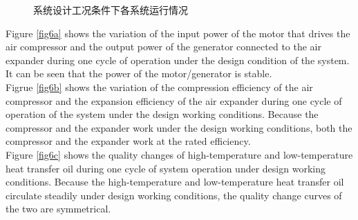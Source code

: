 \documentclass[journal,onecolumn]{IEEEtran}
\begin{document}
\begin{figure}[ht]
{\begin{minipage}{0.5\linewidth}
			\label{fig6c}   %
		\end{minipage}
	}
	\caption{系统设计工况条件下各系统运行情况} %
	\label{fig:6}  %
\end{figure}

Figure \ref{fig6a} shows the variation of the input power of the motor that drives the air compressor and the output power of the generator connected to the air expander during one cycle of operation under the design condition of the system. It can be seen that the power of the motor/generator is stable.\\

Figrue \ref{fig6b} shows the variation of the compression efficiency of the air compressor and the expansion efficiency of the air expander during one cycle of operation of the system under the design working conditions. Because the compressor and the expander work under the design working conditions, both the compressor and the expander work at the rated efficiency.\\

Figure \ref{fig6c} shows the quality changes of high-temperature and low-temperature heat transfer oil during one cycle of system operation under design working conditions. Because the high-temperature and low-temperature heat transfer oil circulate steadily under design working conditions, the quality change curves of the two are symmetrical.\\
\end{document}
